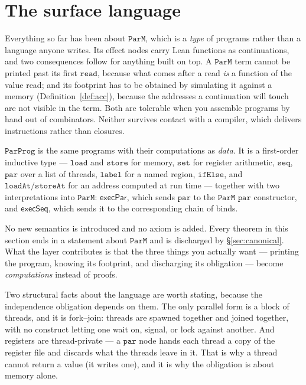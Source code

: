 \documentclass[11pt,a4paper]{article}
\theoremstyle{definition}
\theoremstyle{plain}
\theoremstyle{remark}
\newcommand{\PM}{\texttt{ParM}}
\begin{document}
\section{The surface language}\label{sec:lang}

Everything so far has been about $\PM$, which is a \emph{type} of programs rather than a
language anyone writes. Its effect nodes carry Lean functions as continuations, and two
consequences follow for anything built on top. A $\PM$ term cannot be printed past its first
$\texttt{read}$, because what comes after a read \emph{is} a function of the value read; and
its footprint has to be obtained by simulating it against a memory
(Definition~\ref{def:acc}), because the addresses a continuation will touch are not visible
in the term. Both are tolerable when you assemble programs by hand out of combinators.
Neither survives contact with a compiler, which delivers instructions rather than closures.

$\texttt{ParProg}$ is the same programs with their computations as \emph{data}. It is a
first-order inductive type --- $\texttt{load}$ and $\texttt{store}$ for memory,
$\texttt{set}$ for register arithmetic, $\texttt{seq}$, $\texttt{par}$ over a list of
threads, $\texttt{label}$ for a named region, $\texttt{ifElse}$, and
$\texttt{loadAt}/\texttt{storeAt}$ for an address computed at run time --- together with two
interpretations into $\PM$: $\mathsf{execPar}$, which sends $\texttt{par}$ to the $\PM$
$\texttt{par}$ constructor, and $\mathsf{execSeq}$, which sends it to the corresponding
chain of binds.

No new semantics is introduced and no axiom is added. Every theorem in this section ends in
a statement about $\PM$ and is discharged by \S\ref{sec:canonical}. What the layer
contributes is that the three things you actually want --- printing the program, knowing its
footprint, and discharging its obligation --- become \emph{computations} instead of proofs.

Two structural facts about the language are worth stating, because the independence
obligation depends on them. The only parallel form is a block of threads, and it is
fork--join: threads are spawned together and joined together, with no construct letting one
wait on, signal, or lock against another. And registers are thread-private --- a
$\texttt{par}$ node hands each thread a copy of the register file and discards what the
threads leave in it. That is why a thread cannot return a value (it writes one), and it is
why the obligation is about memory alone.
\end{document}
